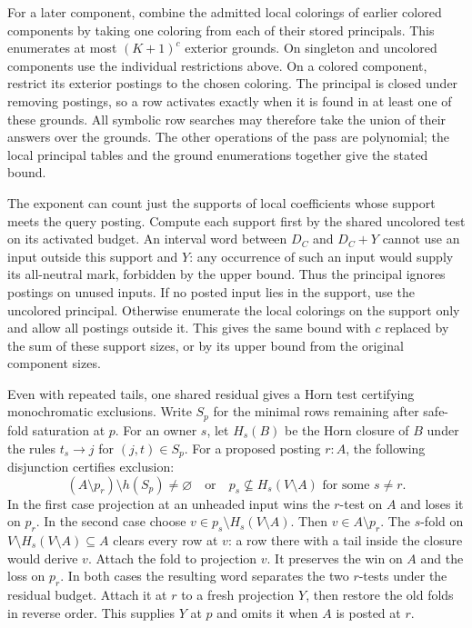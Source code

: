 For a later component, combine the admitted local
colorings of earlier colored components by taking
one coloring from each of their stored principals.
This enumerates at most $(K+1)^c$ exterior grounds.
On singleton and uncolored components use the
individual restrictions above. On a colored
component, restrict its exterior postings to
the chosen coloring. The principal is closed
under removing postings, so a row activates
exactly when it is found in at least one of these
grounds. All symbolic row searches may therefore
take the union of their answers over the grounds.
The other operations of the pass are polynomial;
the local principal tables and the ground
enumerations together give the stated bound.

The exponent can count just the supports of local
coefficients whose support meets the query posting.
Compute each support first by the shared uncolored
test on its activated budget. An interval word
between $D_C$ and $D_C+Y$ cannot use an input
outside this support and $Y$: any occurrence of such
an input would supply its all-neutral mark, forbidden
by the upper bound. Thus the principal ignores
postings on unused inputs. If no posted input lies
in the support, use the uncolored principal.
Otherwise enumerate the local colorings on the
support only and allow all postings outside it.
This gives the same bound with $c$ replaced by the
sum of these support sizes, or by its upper bound
from the original component sizes.

Even with repeated tails, one shared residual gives
a Horn test certifying monochromatic exclusions. Write
$S_p$ for the minimal rows remaining after safe-fold
saturation at $p$. For an owner $s$, let $H_s(B)$ be
the Horn closure of $B$ under the rules $t_s\to j$ for
$(j,t)\in S_p$. For a proposed posting $r:A$, the
following disjunction certifies exclusion:
\[
 (A\setminus p_r)\setminus h(S_p)\ne\varnothing
 \quad\text{or}\quad
 p_s\not\subseteq H_s(V\setminus A)\text{ for some }s\ne r .
\]
In the first case projection at an unheaded input
wins the $r$-test on $A$ and loses it on $p_r$.
In the second case choose $v\in p_s\setminus H_s(V\setminus A)$.
Then $v\in A\setminus p_r$. The $s$-fold on
$V\setminus H_s(V\setminus A)\subseteq A$ clears
every row at $v$: a row there with a tail inside
the closure would derive $v$. Attach the fold to
projection $v$. It preserves the win on $A$ and
the loss on $p_r$. In both cases the resulting
word separates the two $r$-tests under the residual
budget. Attach it at $r$ to a fresh projection
$Y$, then restore the old folds in reverse order.
This supplies $Y$ at $p$ and omits it when $A$
is posted at $r$.

